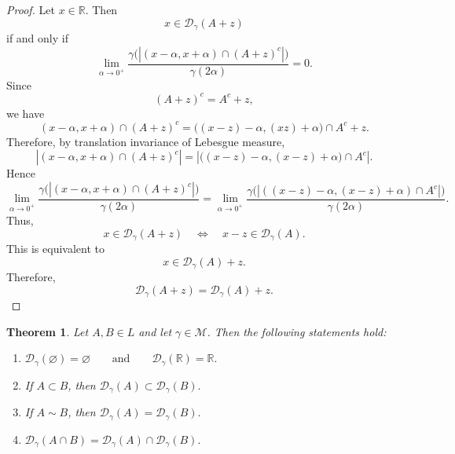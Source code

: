\documentclass{amsart}
\newtheorem{theorem}{Theorem}
\theoremstyle{plain}
\numberwithin{equation}{section}
\begin{document}
\begin{proof}
Let $x \in \mathbb{R}$. Then $$ x \in \mathcal{D}_\gamma(A+z) $$ if and only if $$ \lim_{\alpha \to 0^+} \frac{\gamma\bigl(|(x-\alpha,x+\alpha)\cap (A+z)^c|\bigr)}{\gamma(2\alpha)}=0. $$
Since
$$ (A+z)^c=A^c+z, $$ we have $$ (x-\alpha,x+\alpha)\cap (A+z)^c = \bigl((x-z)-\alpha,(x z)+\alpha\bigr)\cap A^c + z. $$ Therefore, by translation invariance of Lebesgue measure,
$$ \left|(x-\alpha,x+\alpha)\cap (A+z)^c\right| = \left|\bigl((x-z)-\alpha,(x-z)+\alpha\bigr)\cap A^c\right|. $$
Hence $$ \lim_{\alpha \to 0^+} \frac{\gamma\bigl(|(x-\alpha,x+\alpha)\cap (A+z)^c|\bigr)}{\gamma(2\alpha)} = \lim_{\alpha \to 0^+}
\frac{\gamma\bigl(|((x-z)-\alpha,(x-z)+\alpha)\cap A^c|\bigr)}{\gamma(2\alpha)}. $$
Thus, $$ x \in \mathcal{D}_\gamma(A+z) \quad\Longleftrightarrow\quad x-z \in \mathcal{D}_\gamma(A). $$
This is equivalent to $$ x \in \mathcal{D}_\gamma(A)+z. $$
Therefore, $$ \mathcal{D}_\gamma(A+z)=\mathcal{D}_\gamma(A)+z. $$
\end{proof}

\begin{theorem}\label{thm2}
Let $A,B \in L$ and let $\gamma \in \mathcal{M}$. Then the following statements hold:

\begin{enumerate}
\item
$\mathcal{D}_\gamma(\varnothing)=\varnothing \qquad\text{and}\qquad \mathcal{D}_\gamma(\mathbb{R})=\mathbb{R}.$

\item If $A \subset B$, then $ \mathcal{D}_\gamma(A)\subset \mathcal{D}_\gamma(B).$
\item
If $A \sim B$, then $ \mathcal{D}_\gamma(A)=\mathcal{D}_\gamma(B).$

\item $ \mathcal{D}_\gamma(A\cap B)=\mathcal{D}_\gamma(A)\cap \mathcal{D}_\gamma(B).$
\end{enumerate}
\end{theorem}
\end{document}
